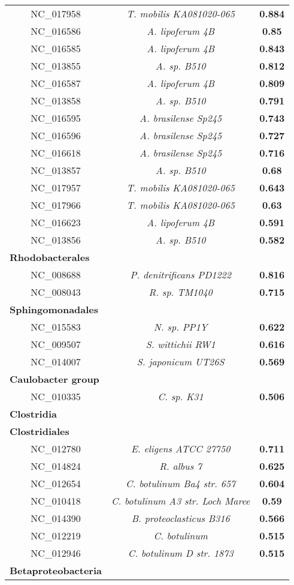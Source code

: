 \begin{landscape}
\begin{table}
\begin{minipage}[t]{0.5\textwidth}
\begin{tiny}
\begin{tabular}{c>{\itshape}c>{\bfseries}c}
NC\_017958&T. mobilis KA081020-065&0.884\\
NC\_016586&A. lipoferum 4B&0.85\\
NC\_016585&A. lipoferum 4B&0.843\\
NC\_013855&A. sp. B510&0.812\\
NC\_016587&A. lipoferum 4B&0.809\\
NC\_013858&A. sp. B510&0.791\\
NC\_016595&A. brasilense Sp245&0.743\\
NC\_016596&A. brasilense Sp245&0.727\\
NC\_016618&A. brasilense Sp245&0.716\\
NC\_013857&A. sp. B510&0.68\\
NC\_017957&T. mobilis KA081020-065&0.643\\
NC\_017966&T. mobilis KA081020-065&0.63\\
NC\_016623&A. lipoferum 4B&0.591\\
NC\_013856&A. sp. B510&0.582\\
\multicolumn{1}{l}{\textbf{Rhodobacterales}}\\
NC\_008688&P. denitrificans PD1222&0.816\\
NC\_008043&R. sp. TM1040&0.715\\
\multicolumn{1}{l}{\textbf{Sphingomonadales}}\\
NC\_015583&N. sp. PP1Y&0.622\\
NC\_009507&S. wittichii RW1&0.616\\
NC\_014007&S. japonicum UT26S&0.569\\
\multicolumn{1}{l}{\textbf{Caulobacter group}}\\
NC\_010335&C. sp. K31&0.506\\
\multicolumn{1}{l}{\textbf{Clostridia}}\\
\hline
\multicolumn{1}{l}{\textbf{Clostridiales}}\\
NC\_012780&E. eligens ATCC 27750&0.711\\
NC\_014824&R. albus 7&0.625\\
NC\_012654&C. botulinum Ba4 str. 657&0.604\\
NC\_010418&C. botulinum A3 str. Loch Maree&0.59\\
NC\_014390&B. proteoclasticus B316&0.566\\
NC\_012219&C. botulinum&0.515\\
NC\_012946&C. botulinum D str. 1873&0.515\\
\multicolumn{1}{l}{\textbf{Betaproteobacteria}}\\

\end{tabular}
\end{tiny}
\end{minipage}
\end{table}
\end{landscape}
